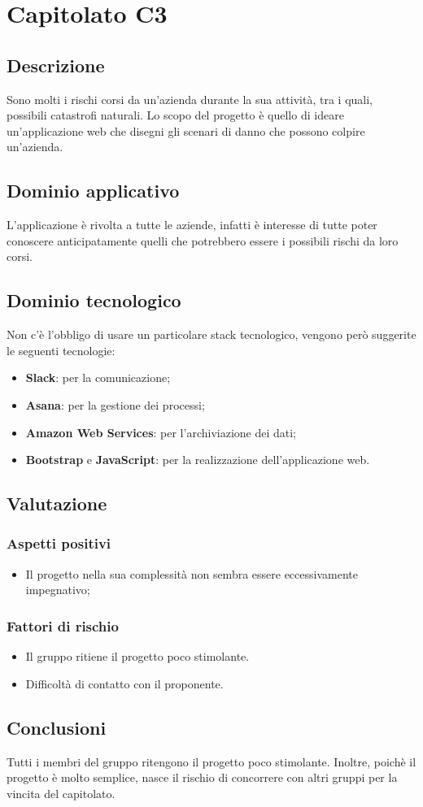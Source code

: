 \section {Capitolato C3}
	\subsection {Descrizione}
		Sono molti i rischi corsi da un'azienda durante la sua attività, tra i quali, possibili catastrofi naturali. Lo scopo del progetto è quello di ideare un'applicazione web che disegni gli scenari di
		danno che possono colpire un'azienda.
	\subsection {Dominio applicativo}
		L'applicazione è rivolta a tutte le aziende, infatti è interesse di tutte poter conoscere anticipatamente quelli che potrebbero essere i possibili rischi da loro corsi.
	\subsection {Dominio tecnologico}
		Non c'è l'obbligo di usare un particolare stack tecnologico, vengono però suggerite le seguenti tecnologie:
		\begin{itemize}
			\item \textbf{Slack}: per la comunicazione;
			\item \textbf{Asana}: per la gestione dei processi;
			\item \textbf{Amazon Web Services}: per l'archiviazione dei dati;
			\item \textbf{Bootstrap} e \textbf{JavaScript}: per la realizzazione dell'applicazione web.
		\end{itemize}
	\subsection {Valutazione}
		\subsubsection {Aspetti positivi}
			\begin{itemize}
				\item Il progetto nella sua complessità non sembra essere eccessivamente impegnativo;
			\end{itemize}
		\subsubsection {Fattori di rischio}
			\begin{itemize}
				\item Il gruppo ritiene il progetto poco stimolante.
				\item Difficoltà di contatto con il proponente.
			\end{itemize}
	\subsection {Conclusioni}
		Tutti i membri del gruppo ritengono il progetto poco stimolante. Inoltre, poichè il progetto è molto semplice, nasce il rischio di concorrere con altri gruppi per la vincita del capitolato.
